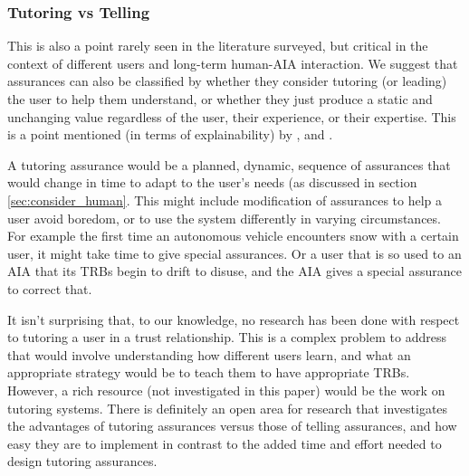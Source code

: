 \subsubsection{Tutoring vs Telling} \label{sec:teach_tell}
    This is also a point rarely seen in the literature surveyed, but critical in the context of different users and long-term human-AIA interaction. We suggest that assurances can also be classified by whether they consider tutoring (or leading) the user to help them understand, or whether they just produce a static and unchanging value regardless of the user, their experience, or their expertise. This is a point mentioned (in terms of explainability) by \citet{Lacave2002-cu}, and \citet{Lacher2014-yc}.

    A tutoring assurance would be a planned, dynamic, sequence of assurances that would change in time to adapt to the user's needs (as discussed in section \ref{sec:consider_human}. This might include modification of assurances to help a user avoid boredom, or to use the system differently in varying circumstances. For example the first time an autonomous vehicle encounters snow with a certain user, it might take time to give special assurances. Or a user that is so used to an AIA that its TRBs begin to drift to disuse, and the AIA gives a special assurance to correct that.

    It isn't surprising that, to our knowledge, no research has been done with respect to tutoring a user in a trust relationship. This is a complex problem to address that would involve understanding how different users learn, and what an appropriate strategy would be to teach them to have appropriate TRBs. However, a rich resource (not investigated in this paper) would be the work on tutoring systems. There is definitely an open area for research that investigates the advantages of tutoring assurances versus those of telling assurances, and how easy they are to implement in contrast to the added time and effort needed to design tutoring assurances.
